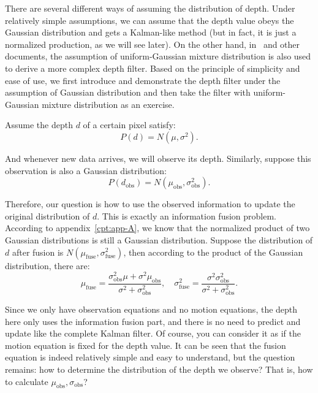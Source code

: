 There are several different ways of assuming the distribution of depth. Under relatively simple assumptions, we can assume that the depth value obeys the Gaussian distribution and gets a Kalman-like method (but in fact, it is just a normalized production, as we will see later). On the other hand, in~\cite{Vogiatzis2011, Forster2014} and other documents, the assumption of uniform-Gaussian mixture distribution is also used to derive a more complex depth filter. Based on the principle of simplicity and ease of use, we first introduce and demonstrate the depth filter under the assumption of Gaussian distribution and then take the filter with uniform-Gaussian mixture distribution as an exercise.

Assume the depth $d$ of a certain pixel satisfy:
\begin{equation}
	P(d) = N(\mu, \sigma^2).
\end{equation}

And whenever new data arrives, we will observe its depth. Similarly, suppose this observation is also a Gaussian distribution:
\begin{equation}
	P(d_{\mathrm{obs}}) = N(\mu_{\mathrm{obs}}, \sigma_{\mathrm{obs}}^2 ).
\end{equation}

Therefore, our question is how to use the observed information to update the original distribution of $d$. This is exactly an information fusion problem. According to appendix~\ref{cpt:app-A}, we know that the normalized product of two Gaussian distributions is still a Gaussian distribution. Suppose the distribution of $d$ after fusion is $N(\mu_{\mathrm{fuse}}, \sigma_{\mathrm{fuse}}^2)$, then according to the product of the Gaussian distribution, there are:
\begin{equation}
	{\mu _{\mathrm{fuse}}} = \frac{{\sigma _{\mathrm{obs}}^2\mu  + {\sigma ^2}{\mu _{\mathrm{obs}}}}}{{{\sigma ^2} + \sigma _{\mathrm{obs}}^2}},\quad \sigma _{\mathrm{fuse}}^2 = \frac{{{\sigma ^2}\sigma _{\mathrm{obs}}^2}}{{{\sigma ^2} + \sigma _{\mathrm{obs}}^2}}.
\end{equation}

Since we only have observation equations and no motion equations, the depth here only uses the information fusion part, and there is no need to predict and update like the complete Kalman filter. Of course, you can consider it as if the motion equation is fixed for the depth value. It can be seen that the fusion equation is indeed relatively simple and easy to understand, but the question remains: how to determine the distribution of the depth we observe? That is, how to calculate $\mu_{\mathrm{obs}}, \sigma_{\mathrm{obs}}$?

